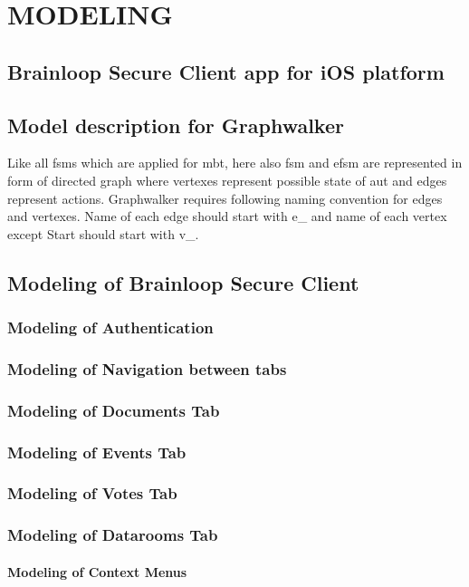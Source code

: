 \chapter{MODELING}
\label{chapter:modeling}


\section{Brainloop Secure Client app for iOS platform} 
\section{Model description for Graphwalker}
\par
Like all \acrshort{fsm}s which are applied for \acrshort{mbt}, here also \acrshort{fsm} and \acrshort{efsm} are represented in form of directed graph where vertexes represent possible state of \acrshort{aut} and edges represent actions. Graphwalker requires following naming convention for edges and vertexes. Name of each edge should start with e\_ and name of each vertex except Start should start with v\_.

\section{Modeling of Brainloop Secure Client}
\subsection{Modeling of Authentication}
\subsection{Modeling of Navigation between tabs}
\subsection{Modeling of Documents Tab}
\subsection{Modeling of Events Tab}
\subsection{Modeling of Votes Tab}
\subsection{Modeling of Datarooms Tab}
\subsubsection{Modeling of Context Menus}
